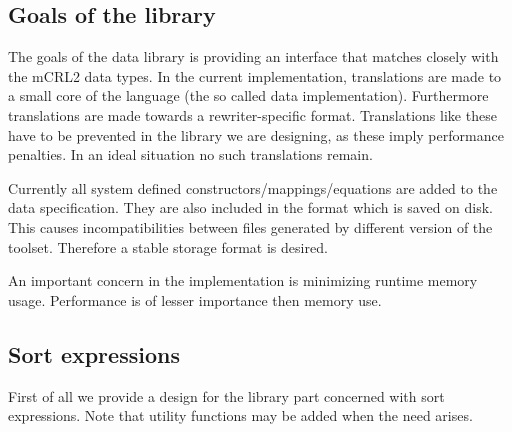 \documentclass[a4paper,11pt]{article}
\newcommand{\comment}[1]{\begin{quotation} {\sf *** #1 ***} \end{quotation}}
\begin{document}
\subsection{Goals of the library}
The goals of the data library is providing an interface that matches closely with the mCRL2 data types. In the current implementation, translations are made to a small core of the language (the so called data implementation). Furthermore translations are made towards a rewriter-specific format. Translations like these have to be prevented in the library we are designing, as these imply performance penalties. In an ideal situation no such translations remain.

Currently all system defined constructors/mappings/equations are added to the data specification. They are also included in the format which is saved on disk. This causes incompatibilities between files generated by different version of the toolset. Therefore a stable storage format is desired.

An important concern in the implementation is minimizing runtime memory usage. Performance is of lesser importance then memory use.

\subsection{Sort expressions}
% 
First of all we provide a design for the library part concerned with sort expressions. Note that utility functions may be added when the need arises.
\end{document}
